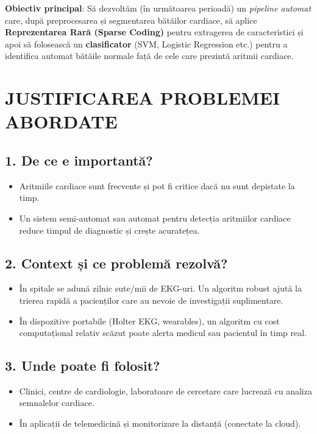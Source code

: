 \documentclass[12pt]{article}  %
\begin{document}
\textbf{Obiectiv principal}: Să dezvoltăm (în următoarea perioadă) un \emph{pipeline automat} care, după preprocesarea și segmentarea bătăilor cardiace, să aplice \textbf{Reprezentarea Rară (Sparse Coding)} pentru extragerea de caracteristici și apoi să folosească un \textbf{clasificator} (SVM, Logistic Regression etc.) pentru a identifica automat bătăile normale față de cele care prezintă aritmii cardiace.

\section{JUSTIFICAREA PROBLEMEI ABORDATE}

\subsection*{1. De ce e importantă?}
\begin{itemize}
    \item Aritmiile cardiace sunt frecvente și pot fi critice dacă nu sunt depistate la timp.
    \item Un sistem semi-automat sau automat pentru detecția aritmiilor cardiace reduce timpul de diagnostic și crește acuratețea.
\end{itemize}

\subsection*{2. Context și ce problemă rezolvă?}
\begin{itemize}
    \item În spitale se adună zilnic sute/mii de EKG-uri. Un algoritm robust ajută la trierea rapidă a pacienților care au nevoie de investigații suplimentare.
    \item În dispozitive portabile (Holter EKG, wearables), un algoritm cu cost computațional relativ scăzut poate alerta medicul sau pacientul în timp real.
\end{itemize}

\subsection*{3. Unde poate fi folosit?}
\begin{itemize}
    \item Clinici, centre de cardiologie, laboratoare de cercetare care lucrează cu analiza semnalelor cardiace.
    \item În aplicații de telemedicină și monitorizare la distanță (conectate la cloud).
\end{itemize}
\end{document}
